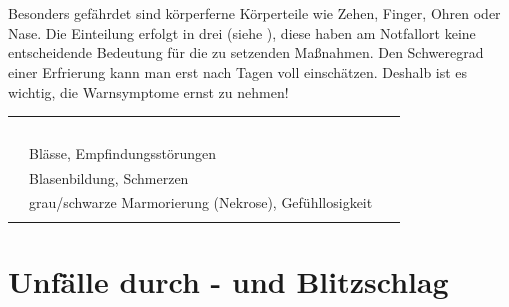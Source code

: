 \section{}

\label{topic:erfrierung}%


\Text{\TxBeschreibung}
{%
%
}
Besonders gefährdet sind körperferne Körperteile wie Zehen,
Finger, Ohren oder Nase.
Die Einteilung erfolgt in drei  (siehe
), diese haben am Notfallort
keine entscheidende Bedeutung für die zu setzenden
Maßnahmen. Den Schweregrad einer Erfrierung kann man erst
nach Tagen voll einschätzen. Deshalb ist es wichtig, die
Warnsymptome ernst zu nehmen!


\begin{table}[H]
\begin{center}
\begin{tabulary}{\linewidth}[H]{CLC}\addlinespace\toprule\addlinespace
\noindent{}
 &
\noindent{}
 &
\noindent~
\\\addlinespace\midrule{}
 &
Blässe, Empfindungsstörungen
 &
\\
 &
Blasenbildung, Schmerzen
 &
\\
 &
grau/schwarze Marmorierung (Nekrose), Gefühllosigkeit
\\\addlinespace\bottomrule
\end{tabulary}
\end{center}
\end{table}





\clearpage %
\section{Unfälle durch - und 
Blitzschlag}

